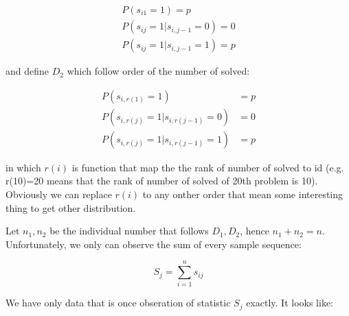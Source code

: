 \documentclass{article}
\begin{document}
\begin{align*} %
P(s_{i1} = 1) = p \\
P(s_{ij} = 1 | s_{i,j-1}=0) = 0 \\
P(s_{ij} = 1 | s_{i,j-1}=1) = p
\end{align*}


and define $D_2$ which follow order of the number of solved:


\begin{align*}
P(s_{i,r(1)} = 1) &= p \\
P(s_{i,r(j)} = 1 | s_{i,r(j-1)}=0) &= 0 \\
P(s_{i,r(j)} = 1 | s_{i,r(j-1)}=1) &= p
\end{align*}


in which $r(i)$ is function that map the the rank of number of solved to id
(e.g. r(10)=20 means that the rank of number of solved of 20th problem is 10).
Obviously we can replace $r(i)$ to any onther order that mean some interesting thing to get other distribution.

Let $n_1,n_2$ be the individual number that follows $D_1,D_2$, hence $n_1+n_2=n$. Unfortunately, we only can 
observe the sum of every sample sequence:

\[
S_j = \sum_{i=1}^n s_{ij}
\]

We have only data that is once obseration of statistic $S_j$ exactly. It looks like:


\begin{figure}[h]

\centering

 
\end{figure}
\end{document}
